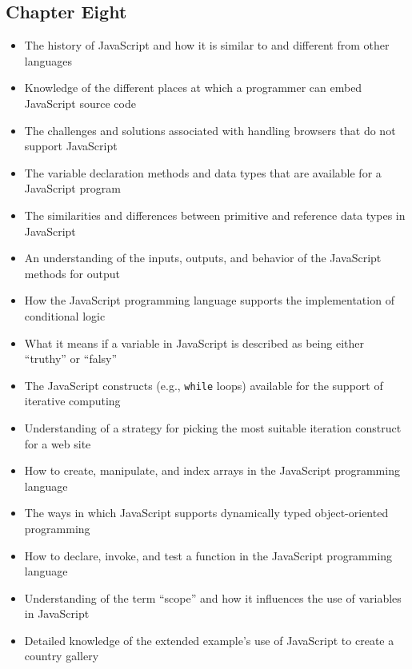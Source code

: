 \documentclass[11pt]{article}
\begin{document}
\vspace*{-.2in}
\subsection*{Chapter Eight}

\begin{itemize}


  \item The history of JavaScript and how it is similar to and different from
    other languages

  \item Knowledge of the different places at which a programmer can embed
    JavaScript source code

  \item The challenges and solutions associated with handling browsers that do
    not support JavaScript

  \item The variable declaration methods and data types that are available for a
    JavaScript program

  \item The similarities and differences between primitive and reference data
    types in JavaScript

  \item An understanding of the inputs, outputs, and behavior of the JavaScript
    methods for output

  \item How the JavaScript programming language supports the implementation of
    conditional logic

  \item What it means if a variable in JavaScript is described as being either
    ``truthy'' or ``falsy''

  \item The JavaScript constructs (e.g., {\tt while} loops) available for the
    support of iterative computing

  \item Understanding of a strategy for picking the most suitable iteration
    construct for a web site

  \item How to create, manipulate, and index arrays in the JavaScript
    programming language

  \item The ways in which JavaScript supports dynamically typed object-oriented
    programming

  \item How to declare, invoke, and test a function in the JavaScript
    programming language

  \item Understanding of the term ``scope'' and how it influences the use of
    variables in JavaScript

  \item Detailed knowledge of the extended example's use of JavaScript to create
    a country gallery

\end{itemize}
\end{document}

